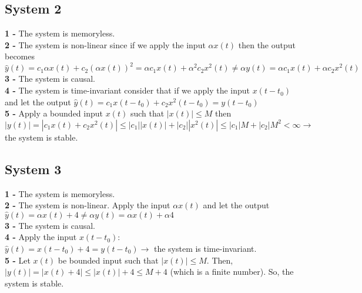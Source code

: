 \documentclass[12pt]{article}
\begin{document}
    \subsection*{System 2}
    \textbf{1 - }The system is memoryless.\\
    \textbf{2 - }The system is non-linear since if we apply the input \(\alpha x(t)\) then the output
    becomes 
    \(\hat{y}(t) = c_1\alpha x(t) + c_2(\alpha x(t))^2 = \alpha c_1x(t) + \alpha^2 c_2x^2(t) \neq \alpha y(t) = \alpha c_1x(t) + \alpha c_2x^2(t)\) \\
    \textbf{3 - }The system is causal. \\
    \textbf{4 - }The system is time-invariant consider that if we apply the input \(x(t-t_0)\) and
    let the output \(\hat{y}(t)=c_1x(t-t_0) + c_2x^2(t-t_0) = y(t-t_0)\)\\
    \textbf{5 - }Apply a bounded input \(x(t)\) such that \(\left\lvert x(t)\right\rvert \leq M\) then 
    \(\left\lvert y(t)\right\rvert  = \left\lvert c_1x(t) + c_2x^2(t)\right\rvert \leq \left\lvert c_1\right\rvert \left\lvert x(t)\right\rvert  + \left\lvert c_2\right\rvert \left\lvert x^2(t)\right\rvert  \leq \left\lvert c_1\right\rvert M + \left\lvert c_2\right\rvert M^2 < \infty \longrightarrow\) the system is stable.\\

    \subsection*{System 3}
    \textbf{1 - }The system is memoryless. \\
    \textbf{2 - }The system is non-linear. Apply the input \(\alpha x(t)\) and let the output \(\hat{y}(t)=\alpha x(t) + 4 \neq \alpha y(t) = \alpha x(t) + \alpha 4\)\\
    \textbf{3 - }The system is causal. \\
    \textbf{4 - }Apply the input \(x(t-t_0)\):\\
    \(\hat{y}(t) = x(t-t_0) + 4 = y(t-t_0) \longrightarrow\) the system is time-invariant. \\
    \textbf{5 - }Let \(x(t)\) be bounded input such that \(\left\lvert x(t)\right\rvert \leq M\). Then, 
    \(\left\lvert y(t)\right\rvert = \left\lvert x(t) + 4\right\rvert \leq \left\lvert x(t)\right\rvert + 4 \leq M+4\) (which is a finite number). So, the system
    is stable. \\
\end{document}
